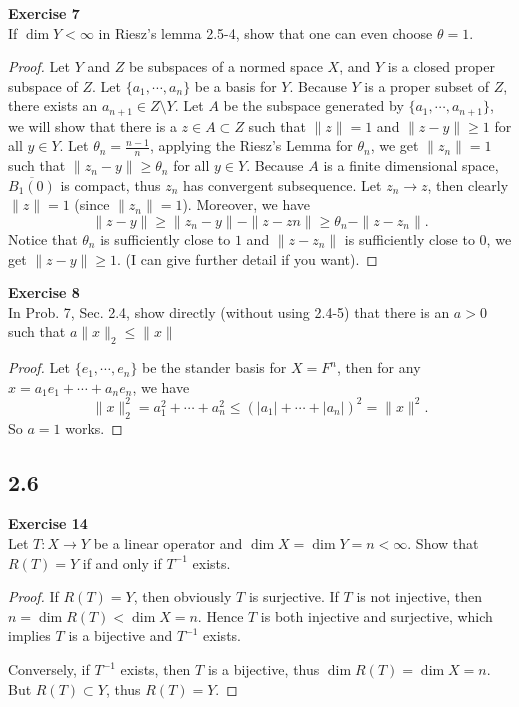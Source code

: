 \documentclass[12pt, a4paper]{article}
\theoremstyle{plain}
\newenvironment{exercise}[2][Exercise]
    { \begin{mdframed}[backgroundcolor=gray!20] \textbf{#1 #2} \\}
    {  \end{mdframed}}
\begin{document}
\begin{exercise}{7}
If $\dim Y<\infty$ in Riesz's lemma 2.5-4, show that one can even choose $\theta = 1$.
\end{exercise}
	\begin{proof}
	Let $Y$ and $Z$ be subspaces of a normed space $X$, and $Y$ is a closed proper subspace of $Z$. Let $\{a_1,\cdots,a_n\}$ be a basis for $Y$. Because $Y$ is a proper subset of $Z$, there exists an $a_{n+1}\in Z\setminus Y$. Let $A$ be the subspace generated by $\{a_1,\cdots,a_{n+1}\}$, we will show that there is a $z\in A\subset Z$ such that $\|z\| = 1$ and $\|z-y\|\geq 1$ for all $y\in Y$. Let $\theta_n = \frac{n-1}{n}$, applying the Riesz's Lemma for $\theta_n$, we get $\|z_n\|=1$ such that $\|z_n-y\|\geq \theta_n$ for all $y\in Y$. Because $A$ is a finite dimensional space, $\overline{B_1(0)}$ is compact, thus $z_n$ has convergent subsequence. Let $z_n\rightarrow z$, then clearly $\|z\|=1$ (since $\|z_n\|=1$). Moreover, we have
	\[
	\|z-y\|\geq \|z_n-y\| - \|z-zn\|\geq \theta_n - \|z-z_n\|.
	\]
	Notice that $\theta_n$ is sufficiently close to $1$ and $\|z-z_n\|$ is sufficiently close to $0$, we get $\|z-y\|\geq 1$. (I can give further detail if you want).
	\end{proof}
	

\begin{exercise}{8}
In Prob. 7, Sec. 2.4, show directly (without using 2.4-5) that there is an $a>0$ such that $a\|x\|_2\leq \|x\|$
\end{exercise}
	\begin{proof}
	Let $\{e_1,\cdots,e_n\}$ be the stander basis for $X=F^n$, then for any $x = a_1e_1+\cdots+a_ne_n$, we have
	\[
	\|x\|_2^2 = a_1^2+\cdots+a_n^2\leq (|a_1|+\cdots+|a_n|)^2 = \|x\|^2.
	\]
	So $a=1$ works.
	\end{proof}

\subsection*{2.6}
\begin{exercise}{14}
Let $T:X\rightarrow Y$ be a linear operator and $\dim X = \dim Y = n<\infty$. Show that $R(T)=Y$ if and only if $T^{-1}$ exists.
\end{exercise}
	\begin{proof}
	If $R(T)=Y$, then obviously $T$ is surjective. If $T$ is not injective, then $n = \dim R(T)< \dim X = n$. Hence $T$ is both injective and surjective, which implies $T$ is a bijective and $T^{-1}$ exists.
	
	Conversely, if $T^{-1}$ exists, then $T$ is a bijective, thus $\dim R(T) = \dim X =n$. But $R(T)\subset Y$, thus $R(T)=Y$.
	\end{proof}
\end{document}
